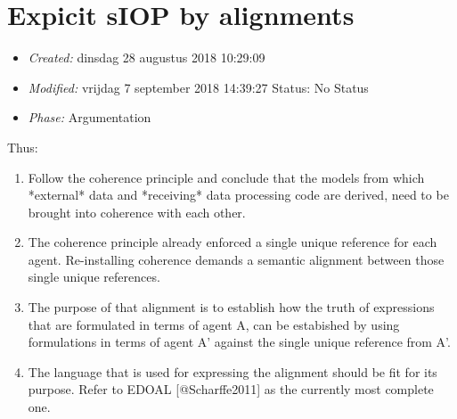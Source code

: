 \documentclass[a4paper,11pt,oneside,oldfontcommands]{memoir}
\theoremstyle{definition}
\theoremstyle{break}		%
\numberwithin{equation}{chapter}
\numberwithin{figure}{chapter}
\begin{document}
\hypertarget{expicit-siop-by-alignments}{%
\section{Expicit sIOP by alignments}\label{expicit-siop-by-alignments}}

\begin{itemize}
\tightlist
\item
  \emph{Created:} dinsdag 28 augustus 2018 10:29:09
\item
  \emph{Modified:} vrijdag 7 september 2018 14:39:27 Status: No Status
\item
  \emph{Phase:} Argumentation
\end{itemize}

\begin{synopsis}
Thus:

\begin{enumerate}
\item Follow the coherence principle and conclude that the models from which *external* data and *receiving* data processing code are derived, need to be brought into coherence with each other.
\item The coherence principle already enforced a single unique reference for each agent. Re-installing coherence demands a semantic alignment between those single unique references. 
\item The purpose of that alignment is to establish how the truth of expressions that are formulated in terms of agent A, can be estabished by using formulations in terms of agent A' against the single unique reference from A'. 
\item The language that is used for expressing the alignment should be fit for its purpose. Refer to EDOAL [@Scharffe2011] as the currently most complete one.
\end{enumerate}

\end{synopsis}
\end{document}
